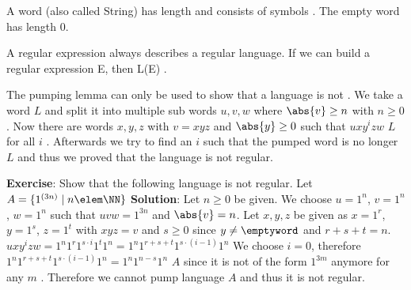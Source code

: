 \documentclass[10pt,a4paper,english]{article}
\author{Tim Schlachter (7039326)}
\begin{document}
    \maketitle

    \newpage
    \tableofcontents
    \newpage

    A word \word (also called String) has length \length and consists of symbols \symbol \elem \sigmaS. \newline
    The empty word \emptyword has length 0. \newline


    \newpage


    \newpage
    A regular expression always describes a regular language. If we can build a regular expression E, then L(E) \elem \REG. \newline


    \newpage
    The pumping lemma can only be used to show that a language is not \REG. We take a word \word \elem $L$ and split it into multiple sub words $u,v,w$
    where $\abs{v}\geq n$ with $n \ge 0$. Now there are words $x,y,z$ with $v=xyz$ and $\abs{y} \ge 0$ such that $uxy^izw$ \elem $L$ for all
    $i$ \elem \NN. Afterwards we try to find an $i$ such that the pumped word is no longer \elem $L$ and thus we proved that the language is not regular.

    \textbf{Exercise}:\newline
    Show that the following language is not regular.\newline
    Let $A=\{ 1^{(3n)} \mid n \elem \NN \}$\newline\newline
    \textbf{Solution}:\newline
    Let $n \geq 0$ be given.\newline
    We choose $u=1^n$, $v=1^n$, $w=1^n$ such that $uvw=1^{3n}$ and $\abs{v}=n$.\newline
    Let $x,y,z$ be given as $x=1^r$, $y=1^s$, $z=1^t$ with $xyz=v$ and $s \ge 0$ since $y \neq \emptyword$ and $r+s+t=n$.\newline
    $uxy^izw=1^n 1^r 1^{s \cdot i} 1^t 1^n=1^n 1^{r+s+t} 1^{s \cdot (i-1)} 1^n$\newline
    We choose $i=0$, therefore $1^n 1^{r+s+t} 1^{s \cdot (i-1)} 1^n = 1^n 1^{n-s} 1^n$ \notelem $A$ since it is not of the form $1^{3m}$ anymore for any $m$ \elem \NN.\newline
    Therefore we cannot pump language $A$ and thus it is not regular.\newline
\end{document}

